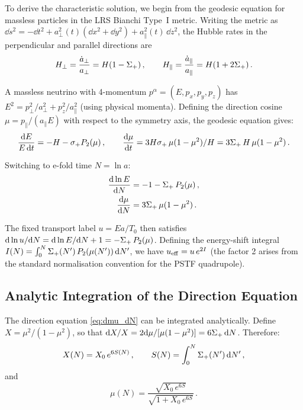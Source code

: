To derive the characteristic solution, we begin from the geodesic equation for massless particles in the LRS Bianchi Type~I metric.  Writing the metric as $\dd s^2 = -\dd t^2 + a_\perp^2(t)(\dd x^2 + \dd y^2) + a_\parallel^2(t)\,\dd z^2$, the Hubble rates in the perpendicular and parallel directions are
\begin{equation}
H_\perp = \frac{\dot{a}_\perp}{a_\perp} = H(1 - \Sigma_+)\,,\qquad H_\parallel = \frac{\dot{a}_\parallel}{a_\parallel} = H(1 + 2\Sigma_+)\,.
\end{equation}

A massless neutrino with 4-momentum $p^\alpha = (E, p_x, p_y, p_z)$ has $E^2 = p_\perp^2/a_\perp^2 + p_z^2/a_\parallel^2$ (using physical momenta).  Defining the direction cosine $\mu = p_\parallel/(a_\parallel E)$ with respect to the symmetry axis, the geodesic equation gives:
\begin{equation}
\frac{\mathrm{d} E}{E\,\mathrm{d} t} = -H - \sigma_+ P_2(\mu)\,,\qquad \frac{\mathrm{d}\mu}{\mathrm{d} t} = 3H\sigma_+\,\mu(1-\mu^2)/H = 3\Sigma_+\,H\,\mu(1-\mu^2)\,.
\end{equation}

Switching to e-fold time $N = \ln a$:
\begin{align}
\frac{\mathrm{d}\ln E}{\mathrm{d} N} &= -1 - \Sigma_+\,P_2(\mu)\,,\label{eq:dE_dN}\\
\frac{\mathrm{d}\mu}{\mathrm{d} N} &= 3\Sigma_+\,\mu(1-\mu^2)\,.\label{eq:dmu_dN}
\end{align}

The fixed transport label $u = Ea/T_0$ then satisfies $\mathrm{d}\ln u/\mathrm{d} N = \mathrm{d}\ln E/\mathrm{d} N + 1 = -\Sigma_+\,P_2(\mu)$.  Defining the energy-shift integral $I(N) = \int_0^N \Sigma_+(N')\,P_2(\mu(N'))\,\mathrm{d} N'$, we have $u_{\rm eff} = u\,e^{2I}$ (the factor 2 arises from the standard normalisation convention for the PSTF quadrupole).

\subsection{Analytic Integration of the Direction Equation}

The direction equation \eqref{eq:dmu_dN} can be integrated analytically.  Define $X = \mu^2/(1-\mu^2)$, so that $\mathrm{d} X/X = 2\mathrm{d}\mu/[\mu(1-\mu^2)] = 6\Sigma_+\,\mathrm{d} N$.  Therefore:
\begin{equation}
X(N) = X_0\,e^{6S(N)}\,,\qquad S(N) = \int_0^N \Sigma_+(N')\,\mathrm{d} N'\,,
\end{equation}
and
\begin{equation}
\mu(N) = \frac{\sqrt{X_0\,e^{6S}}}{\sqrt{1 + X_0\,e^{6S}}}\,.
\end{equation}

